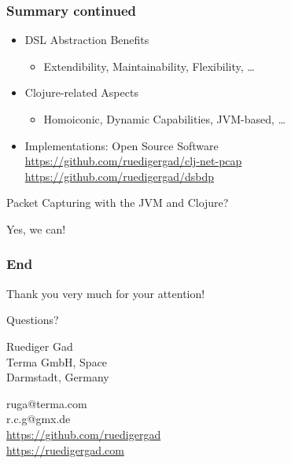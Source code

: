 \documentclass[aspectratio=169]{beamer}
\begin{document}
  \begin{frame}
      \frametitle{Summary continued}

    \begin{itemize}
        \item DSL Abstraction Benefits
            \begin{itemize}
                \item Extendibility, Maintainability, Flexibility, \ldots{}
            \end{itemize}
        \item Clojure-related Aspects
            \begin{itemize}
                \item Homoiconic, Dynamic Capabilities, JVM-based, \ldots{}
            \end{itemize}
        \item Implementations: Open Source Software\\
              \url{https://github.com/ruedigergad/clj-net-pcap}\\
              \url{https://github.com/ruedigergad/dsbdp}
    \end{itemize}
      \pause
    \begin{block}{Packet Capturing with the JVM and Clojure?}
      \begin{center} Yes, we can! \end{center}
    \end{block}
  \end{frame}

  \begin{frame}[c]
    \frametitle{End}
    \begin{block}{Thank you very much for your attention!}
      \begin{center} Questions? \end{center}
    \end{block}
    \vspace{0.5cm}
    \begin{center}Ruediger Gad\\Terma GmbH, Space\\Darmstadt, Germany\end{center}
        \begin{center}ruga@terma.com\\r.c.g@gmx.de\\\url{https://github.com/ruedigergad}\\\url{https://ruedigergad.com}\end{center}
  \end{frame}
\end{document}
